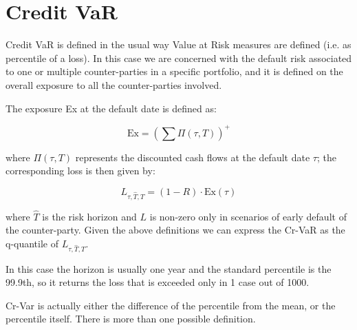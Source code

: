 \section{Credit VaR}\label{credit-var-cr-var}


Credit VaR is defined in the usual way Value at Risk measures are defined (i.e. as percentile of a loss).
In this case we are concerned with the default risk associated to one or
multiple counter-parties in a specific portfolio, and it is defined on
the overall exposure to all the counter-parties involved.

The exposure Ex at the default date is defined as:

\[ \textrm{Ex} = (\sum \Pi(\tau, T))^{+}\]

where \(\Pi(\tau,T)\) represents the discounted cash flows at the
default date \(\tau\); the corresponding loss is then given by:

\[L_{\tau, \hat{T}, T} = (1 - R) \cdot \textrm{Ex}(\tau)\]

where \(\hat{T}\) is the risk horizon and \(L\) is non-zero only in
scenarios of early default of the counter-party. Given the above
definitions we can express the Cr-VaR as the q-quantile of
\(L_{\tau, \hat{T}, T}\).

In this case the horizon is usually one year and the standard percentile is the 99.9th, so it returns the loss that is exceeded only in 1 case out of 1000. 

Cr-Var is actually either the difference of the percentile from the mean,
or the percentile itself. There is more than one possible definition.


%

